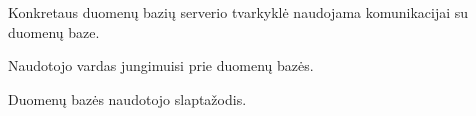 \documentclass[letterpaper,10pt,lithuanian]{sphinxmanual}
\begin{document}
\begin{fulllineitems}
\begin{fulllineitems}
\begin{fulllineitems}

\pysigstartsignatures
\pysigline
{}
\pysigstopsignatures
\end{fulllineitems}



\begin{fulllineitems}

\pysigstartsignatures
\pysigline
{}
\pysigstopsignatures
\end{fulllineitems}



\begin{fulllineitems}

\pysigstartsignatures
\pysigline
{}
\pysigstopsignatures
\end{fulllineitems}



\begin{fulllineitems}

\pysigstartsignatures
\pysigline
{}
\pysigstopsignatures
\end{fulllineitems}


\end{fulllineitems}



\begin{fulllineitems}

\pysigstartsignatures
\pysigline
{}
\pysigstopsignatures
\sphinxAtStartPar
Konkretaus duomenų bazių serverio tvarkyklė naudojama komunikacijai su
duomenų baze.

\end{fulllineitems}



\begin{fulllineitems}

\pysigstartsignatures
\pysigline
{}
\pysigstopsignatures
\sphinxAtStartPar
Naudotojo vardas jungimuisi prie duomenų bazės.

\end{fulllineitems}



\begin{fulllineitems}

\pysigstartsignatures
\pysigline
{}
\pysigstopsignatures
\sphinxAtStartPar
Duomenų bazės naudotojo slaptažodis.


\end{fulllineitems}
\end{fulllineitems}
\end{document}
